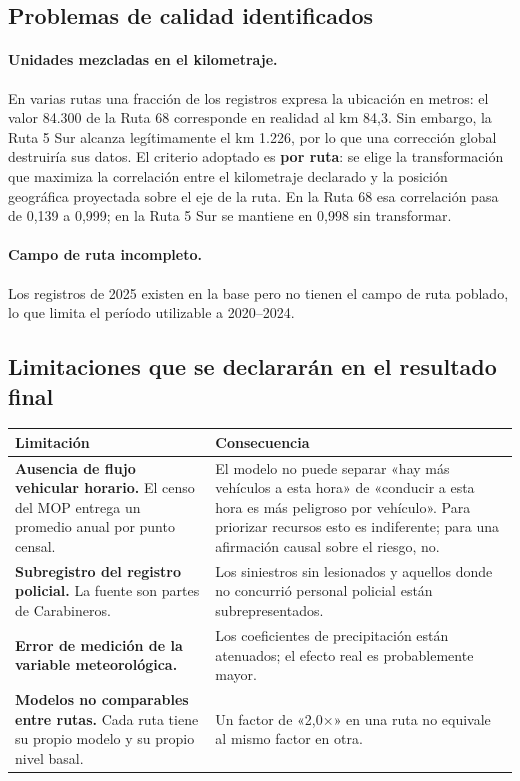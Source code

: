 \documentclass[11pt,a4paper]{article}
\begin{document}
\subsection{Problemas de calidad identificados}

\paragraph{Unidades mezcladas en el kilometraje.} En varias rutas una fracción
de los registros expresa la ubicación en metros: el valor 84.300 de la Ruta 68
corresponde en realidad al km 84,3. Sin embargo, la Ruta 5 Sur alcanza
legítimamente el km 1.226, por lo que una corrección global destruiría sus
datos. El criterio adoptado es \textbf{por ruta}: se elige la transformación que
maximiza la correlación entre el kilometraje declarado y la posición geográfica
proyectada sobre el eje de la ruta. En la Ruta 68 esa correlación pasa de 0,139 a
0,999; en la Ruta 5 Sur se mantiene en 0,998 sin transformar.

\paragraph{Campo de ruta incompleto.} Los registros de 2025 existen en la base
pero no tienen el campo de ruta poblado, lo que limita el período utilizable a
2020--2024.

\subsection{Limitaciones que se declararán en el resultado final}

\begin{center}
\begin{tabular}{p{}p{}}
\toprule
\textbf{Limitación} & \textbf{Consecuencia}\\
\midrule
\textbf{Ausencia de flujo vehicular horario.} El censo del MOP entrega un
promedio anual por punto censal.
& El modelo no puede separar «hay más vehículos a esta hora» de «conducir a esta
hora es más peligroso por vehículo». Para priorizar recursos esto es
indiferente; para una afirmación causal sobre el riesgo, no.\\
\addlinespace
\textbf{Subregistro del registro policial.} La fuente son partes de Carabineros.
& Los siniestros sin lesionados y aquellos donde no concurrió personal policial
están subrepresentados.\\
\addlinespace
\textbf{Error de medición de la variable meteorológica.}
& Los coeficientes de precipitación están atenuados; el efecto real es
probablemente mayor.\\
\addlinespace
\textbf{Modelos no comparables entre rutas.} Cada ruta tiene su propio modelo y
su propio nivel basal.
& Un factor de «2,0$\times$» en una ruta no equivale al mismo factor en otra.\\
\bottomrule
\end{tabular}
\end{center}
\end{document}
